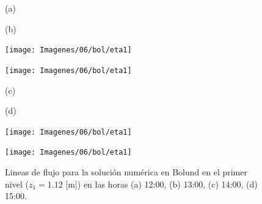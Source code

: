 \begin{figure}[H]
	\begin{minipage}{0.5\linewidth}
		\centering
		\hspace{1cm}(a)
	\end{minipage}%
	\begin{minipage}{0.5\linewidth}
		\centering
		\hspace{-1cm}(b)
	\end{minipage}%
	
	\begin{minipage}{0.5\linewidth}
		\centering
		\texttt{[image: Imagenes/06/bol/eta1]}%
	\end{minipage}%
	\begin{minipage}{0.5\linewidth}
		\centering
		\texttt{[image: Imagenes/06/bol/eta1]}%
	\end{minipage}%
	\vspace{1mm}
	
	\begin{minipage}{0.5\linewidth}
		\centering
		\hspace{1cm}(c)
	\end{minipage}%
	\begin{minipage}{0.5\linewidth}
		\centering
		\hspace{-1cm}(d)
	\end{minipage}%
	
	\begin{minipage}{0.5\linewidth}
		\centering
		\texttt{[image: Imagenes/06/bol/eta1]}%
	\end{minipage}%
	\begin{minipage}{0.5\linewidth}
		\centering
		\texttt{[image: Imagenes/06/bol/eta1]}%
	\end{minipage}%
	\caption{Lineas de flujo para la solución numérica en Bolund en el primer nivel ($z_1 = 1.12$ [m]) en las horas (a) 12:00, (b) 13:00, (c) 14:00, (d) 15:00.}
	\label{fig:06_bol_st}
\end{figure}

